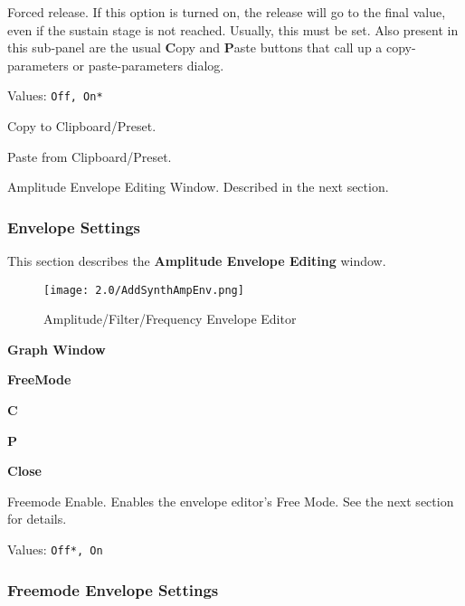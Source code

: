    Forced release.
   If this option is turned on, the release will go to the final value, even
   if the sustain stage is not reached. Usually, this must be set.
   Also present in this sub-panel are the usual \textbf{C}opy
   and \textbf{P}aste buttons that call up a copy-parameters or
   paste-parameters dialog.

   Values: \texttt{Off, On*}

   Copy to Clipboard/Preset.

   Paste from Clipboard/Preset.

   Amplitude Envelope Editing Window.
   Described in the next section.

\subsubsection{Envelope Settings}
\label{subsubsec:envelope_settings}

   This section describes the \textbf{Amplitude Envelope Editing} window.

\begin{figure}[H]
   \centering
   \texttt{[image: 2.0/AddSynthAmpEnv.png]}
   \caption{Amplitude/Filter/Frequency Envelope Editor}
   \label{fig:amplitude_envelope_editor}
\end{figure}

   \begin{enumber}
      \item \textbf{Graph Window}
      \item \textbf{FreeMode}
      \item \textbf{C}
      \item \textbf{P}
      \item \textbf{Close}
   \end{enumber}

   \setcounter{ItemCounter}{0}      %

   Freemode Enable.
   Enables the envelope editor's Free Mode.
   See the next section for details.

   Values: \texttt{Off*, On} \\

\subsubsection{Freemode Envelope Settings}
\label{subsubsec:freemode_envelope_settings}

